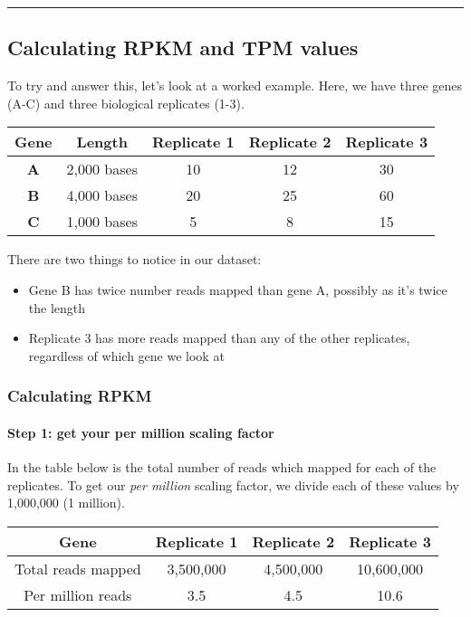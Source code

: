 \documentclass[11pt]{article}
\begin{document}
    \begin{center}\rule{0.5\linewidth}{.4pt}\end{center}

    \hypertarget{calculating-rpkm-and-tpm-values}{%
\subsection{Calculating RPKM and TPM
values}\label{calculating-rpkm-and-tpm-values}}

To try and answer this, let's look at a worked example. Here, we have
three genes (A-C) and three biological replicates (1-3).

\begin{longtable}[]{@{}ccccc@{}}
\hline
Gene & Length & Replicate 1 & Replicate 2 & Replicate 3\tabularnewline
\hline
\endhead
\textbf{A} & 2,000 bases & 10 & 12 & 30\tabularnewline
\textbf{B} & 4,000 bases & 20 & 25 & 60\tabularnewline
\textbf{C} & 1,000 bases & 5 & 8 & 15\tabularnewline
\hline
\end{longtable}

There are two things to notice in our dataset:

\begin{itemize}
\item
  Gene B has twice number reads mapped than gene A, possibly as it's
  twice the length
\item
  Replicate 3 has more reads mapped than any of the other replicates,
  regardless of which gene we look at
\end{itemize}

\hypertarget{calculating-rpkm}{%
\subsubsection{Calculating RPKM}\label{calculating-rpkm}}

\hypertarget{step-1-get-your-per-million-scaling-factor}{%
\paragraph{Step 1: get your per million scaling
factor}\label{step-1-get-your-per-million-scaling-factor}}

In the table below is the total number of reads which mapped for each of
the replicates. To get our \textit{per million} scaling factor, we divide
each of these values by 1,000,000 (1 million).

\begin{longtable}[]{@{}cccc@{}}
\hline
Gene & Replicate 1 & Replicate 2 & Replicate 3\tabularnewline
\hline
\endhead
Total reads mapped & 3,500,000 & 4,500,000 & 10,600,000\tabularnewline
Per million reads & 3.5 & 4.5 & 10.6\tabularnewline
\hline
\end{longtable}
\end{document}
